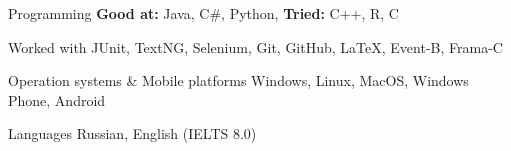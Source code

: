 


\begin{cvskills}


\cvskill
{Programming} %
{\textbf{Good at:} Java, C\#, Python, \textbf{Tried:} C++, R, C} %

\cvskill
{Worked with} %
{JUnit, TextNG, Selenium, Git, GitHub, LaTeX, Event-B, Frama-C} %

\cvskill
{Operation systems \& Mobile platforms} %
{Windows, Linux, MacOS, Windows Phone, Android} %


\cvskill
{Languages} %
{Russian, English (IELTS 8.0)} %


\end{cvskills}